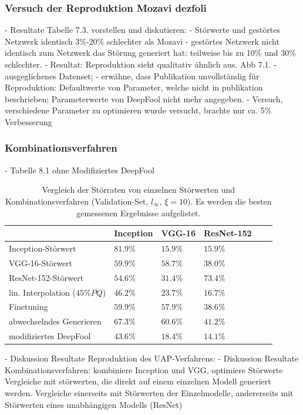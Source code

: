 \documentclass[runningheads]{llncs}
\begin{document}
\subsubsection{Versuch der Reproduktion Mozavi dezfoli}
		- Resultate Tabelle 7.3. vorstellen und diskutieren:
			- Störwerte und gestörtes Netzwerk identisch 3\%-20\% schlechter als Mozavi
			- gestörtes Netzwerk nicht identisch zum Netzwerk das Störung generiert hat: teilweise bis zu 10\% und 30\% schlechter. 
		- Resultat: Reproduktion sieht qualitativ ähnlich aus. Abb 7.1.
		- ausgeglichenes Datenset; 
		- erwähne, dass Publikation unvollständig für Reproduktion: Defaultwerte von Parameter, welche nicht in publikation beschrieben; Parameterwerte von DeepFool nicht mehr angegeben.
		- Versuch, verschiedene Parameter zu optimieren wurde versucht, brachte nur ca. 5\% Verbesserung
\subsubsection{Kombinationsverfahren}
- Tabelle	8.1 ohne Modifiziertes DeepFool
\begin{table}[]
\centering
\caption{Vergleich der Störraten von einzelnen Störwerten und Kombinationsverfahren (Validation-Set, $l_\infty$, $\xi=10$). Es werden die besten gemessenen Ergebnisse aufgelistet.}
\begin{tabular}{|l|l|l|l|l|l|}
\hline

											&	Inception	&	VGG-16		&	ResNet-152		\\ \hline
Inception-Störwert							&	$81.9\%$		&	$15.9\%$	&	$15.9\%$		\\
VGG-16-Störwert								&	$59.9\%$		&	$58.7\%$	&	$38.0\%$		\\
ResNet-152-Störwert							&	$54.6\%$		&	$31.4\%$	&	$73.4\%$		\\ \hline
lin. Interpolation ($45\% \overline{PQ}$)	&	$46.2\%$		&	$23.7\%$	&	$16.7\%$		\\
Finetuning									&	$59.9\%$		&	$57.9\%$	&	$38.6\%$		\\
abwechselndes Generieren						&	$67.3\%$		&	$60.6\%$	&	$41.2\%$		\\
modifiziertes DeepFool						&	$43.6\%$		&	$18.4\%$	&	$14.1\%$		\\


\hline 
\end{tabular}
\label{tbl_vergleich_comb}
\end{table}
- Diskussion Resultate Reproduktion des UAP-Verfahrens: 
- Diskussion Resultate Kombinationsverfahren: kombiniere Inception und VGG, optimiere Störwerte
Vergleiche mit störwerten, die direkt auf einem einzelnen Modell generiert werden. Vergleiche einerseits mit Störwerten der Einzelmodelle, andererseits mit Störwerten eines unabhängigen Modells (ResNet)
\end{document}
